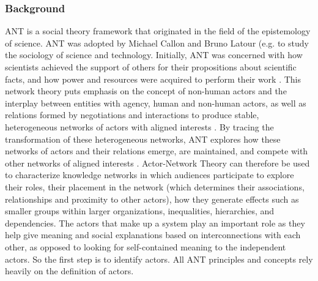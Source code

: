 \subsubsection{Background}
ANT is a social theory framework that originated in the field of the epistemology of science. ANT was adopted by Michael Callon and Bruno Latour (e.g. \cite{callon2007some, latour2005reassembling, latour1988write, latour1999recalling} to study the sociology of science and technology. Initially, ANT was concerned with how scientists achieved the support of others for their propositions about scientific facts, and how power and resources were acquired to perform their work \cite{van2003digital}. This network theory puts emphasis on the concept of non-human actors and the interplay between entities with agency, human and non-human actors, as well as relations formed by negotiations and interactions to produce stable, heterogeneous networks of actors with aligned interests \cite{law1992notes}. By tracing the transformation of these heterogeneous networks, ANT explores how these networks of actors and their relations emerge, are maintained, and compete with other networks of aligned interests \cite{tatnall1999actor}. Actor-Network Theory can therefore be used to characterize knowledge networks in which audiences participate to explore their roles, their placement in the network (which determines their associations, relationships and proximity to other actors), how they generate effects such as smaller groups within larger organizations, inequalities, hierarchies, and dependencies. The actors that make up a system play an important role as they help give meaning and social explanations based on interconnections with each other, as opposed to looking for self-contained meaning to the independent actors. So the first step is to identify actors. All ANT principles and concepts rely heavily on the definition of actors.

